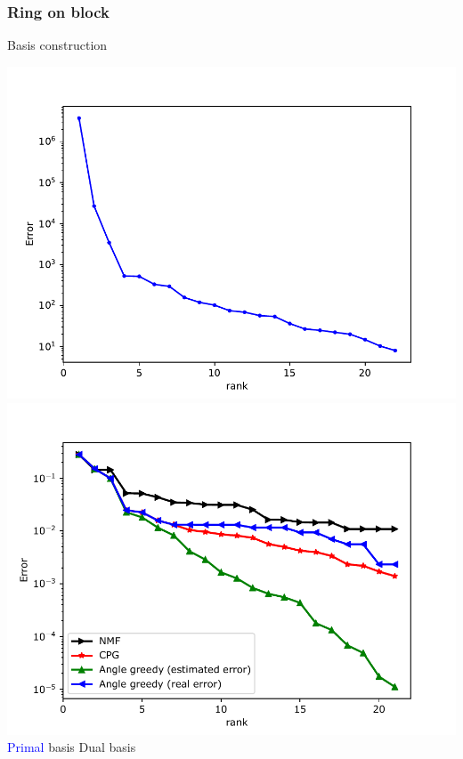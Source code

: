 \documentclass[a4paper,10pt]{beamer}
\newcommand\bl[1]{\textcolor{blue} {#1} }
\newcommand\ma[1]{\textcolor{royalmagenta} {#1} }
\begin{document}
\begin{frame}\frametitle{Ring on block}
	Basis construction
	\begin{center}
		\hspace{-.7cm}
		\includegraphics[width=.55\textwidth]{./images/contact/sgv_ring.pdf}
		\hspace{-.7cm}
		\includegraphics[width=.55\textwidth]{./images/contact/nmf_ring.pdf}
		\small{\hspace{1.8cm} \bl{Primal}basis
			\hspace{3.4cm} \ma{Dual}basis}
	\end{center}
\end{frame}
\end{document}
